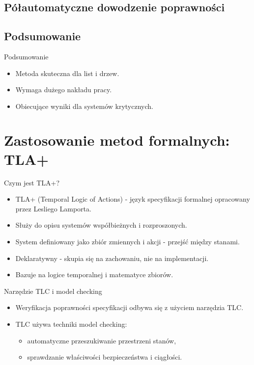 \documentclass{beamer}
\begin{document}
\subsection{Półautomatyczne dowodzenie poprawności}




\subsection{Podsumowanie}
\begin{frame}
\begin{block}{Podsumowanie}
\begin{itemize}
\item Metoda skuteczna dla list i drzew.
\item Wymaga dużego nakładu pracy.
\item Obiecujące wyniki dla systemów krytycznych.
\end{itemize}
\end{block}
\end{frame}

\section{Zastosowanie metod formalnych: TLA+}
\begin{frame}{Czym jest TLA+?}
  \begin{itemize}
      \item TLA+ (Temporal Logic of Actions) - język specyfikacji formalnej opracowany przez Lesliego Lamporta.
      \item Służy do opisu systemów współbieżnych i rozproszonych.
      \item System definiowany jako zbiór zmiennych i akcji - przejść między stanami.
      \item Deklaratywny - skupia się na zachowaniu, nie na implementacji.
      \item Bazuje na logice temporalnej i matematyce zbiorów.
  \end{itemize}
\end{frame}

\begin{frame}{Narzędzie TLC i model checking}
  \begin{itemize}
      \item Weryfikacja poprawności specyfikacji odbywa się z użyciem narzędzia TLC.
      \item TLC używa techniki model checking:
      \begin{itemize}
          \item automatyczne przeszukiwanie przestrzeni stanów,
          \item sprawdzanie właściwości bezpieczeństwa i ciągłości.
      \end{itemize}
  \end{itemize}
\end{frame}
\end{document}
